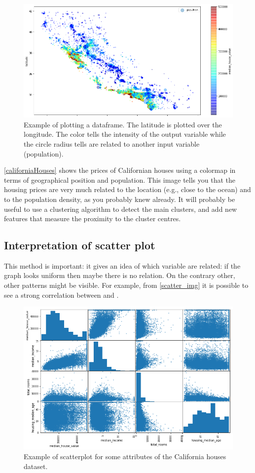 \begin{figure}
\centering
\includegraphics[scale=0.45]{img/DatasetCmap}
\caption{Example of plotting a dataframe. The latitude is plotted over the longitude. The color tells the intensity of the output variable while the circle radius tells are related to another input variable (population).}
\label{californiaHouses}
\end{figure}

\autoref{californiaHouses} shows the prices of Californian houses using a colormap in terms of geographical position and population.
This image tells you that the housing prices are very much related to the location (e.g., close to the ocean) and to the population density, as you probably knew already. It will probably be useful to use a clustering algorithm to detect the main clusters, and add new features that measure the proximity to the cluster centres. 

\subsection{Interpretation of scatter plot}
\label{scatterplot}
This method is important: it gives an idea of which variable are related: if the graph looks uniform then maybe there is no relation. On the contrary other, other patterns might be visible. For example, from \autoref{scatter_img} it is possible to see a strong correlation between  and .
\begin{figure}
\centering
\includegraphics[scale=0.51]{img/scatterplot}
\caption{Example of scatterplot for some attributes of the California houses dataset.}
\label{scatter_img}
\end{figure}


